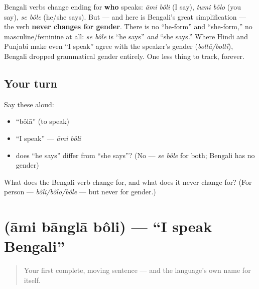 \begin{grammarlens}[title={Grammar Lens: the verb changes for person — but \emph{never} for gender}]
Bengali verbs change ending for \textbf{who} speaks: \emph{āmi bôli} (I say), \emph{tumi bôlo} (you say), \emph{se bôle} (he/she says). But — and here is Bengali's great simplification — the verb \textbf{never changes for gender}. There is no \textquotedblleft{}he-form\textquotedblright{} and \textquotedblleft{}she-form,\textquotedblright{} no masculine/feminine at all: \emph{se bôle} is \textquotedblleft{}he says\textquotedblright{} \emph{and} \textquotedblleft{}she says.\textquotedblright{} Where Hindi and Punjabi make even \textquotedblleft{}I speak\textquotedblright{} agree with the speaker's gender (\emph{boltā/boltī}), Bengali dropped grammatical gender entirely. One less thing to track, forever.
\end{grammarlens}

\subsection*{Your turn}
Say these aloud:

\begin{itemize}
\raggedright
  \item \textquotedblleft{}bôlā\textquotedblright{} (to speak)
  \item \textquotedblleft{}I speak\textquotedblright{} — \emph{āmi bôli}
  \item does \textquotedblleft{}he says\textquotedblright{} differ from \textquotedblleft{}she says\textquotedblright{}? (No — \emph{se bôle} for both; Bengali has no gender)
\end{itemize}

\begin{tcolorbox}[breakable,colback=teal!4,colframe=teal!35!black,title={Before you move on}]
What does the Bengali verb change for, and what does it never change for? (For person — \emph{bôli/bôlo/bôle} — but never for gender.)
\end{tcolorbox}
\section[\bn{আমি} \bn{বাংলা} \bn{বলি}]{   (āmi bānglā bôli) — \textquotedblleft{}I speak Bengali\textquotedblright{}}

\label{lesson:BN-C05-ami-bangla-boli}



\begin{quote}
Your first complete, moving sentence — and the language's own name for itself.
\end{quote}

